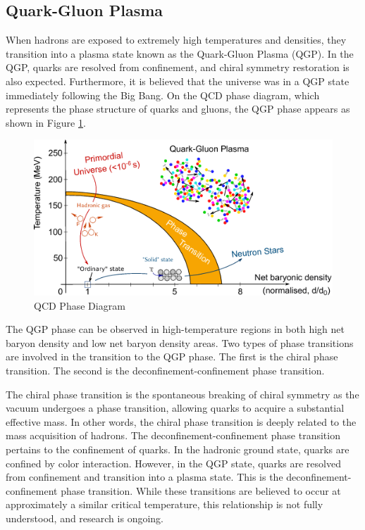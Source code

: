    \subsection{Quark-Gluon Plasma}
        When hadrons are exposed to extremely high temperatures and densities, they transition into a plasma state known as the Quark-Gluon Plasma (QGP). In the QGP, quarks are resolved from confinement, and chiral symmetry restoration is also expected. Furthermore, it is believed that the universe was in a QGP state immediately following the Big Bang. On the QCD phase diagram, which represents the phase structure of quarks and gluons, the QGP phase appears as shown in Figure \ref{QCD_Phase_Diagram}.    
        \begin{figure}[hbtp]
            \centering
            \includegraphics[keepaspectratio, scale=0.6]{fig/1_4_QCDPhaseDiagram.png}
            \caption{QCD Phase Diagram\cite{QCDPhaseDiagram}}
            \label{QCD_Phase_Diagram}
        \end{figure}
        The QGP phase can be observed in high-temperature regions in both high net baryon density and low net baryon density areas. Two types of phase transitions are involved in the transition to the QGP phase. The first is the chiral phase transition. The second is the deconfinement-confinement phase transition.  
        
        The chiral phase transition is the spontaneous breaking of chiral symmetry as the vacuum undergoes a phase transition, allowing quarks to acquire a substantial effective mass. In other words, the chiral phase transition is deeply related to the mass acquisition of hadrons. 
        The deconfinement-\-confinement phase transition pertains to the con\-finement of quarks. 
        In the hadronic ground state, quarks are confined by color interaction.
        However, in the QGP state, quarks are resolved from confinement and transition into a plasma state. 
        This is the deconfinement-\-confinement phase transition. 
        While these transitions are believed to occur at approximately a similar critical temperature, this relationship is not fully understood, and research is ongoing.
        
